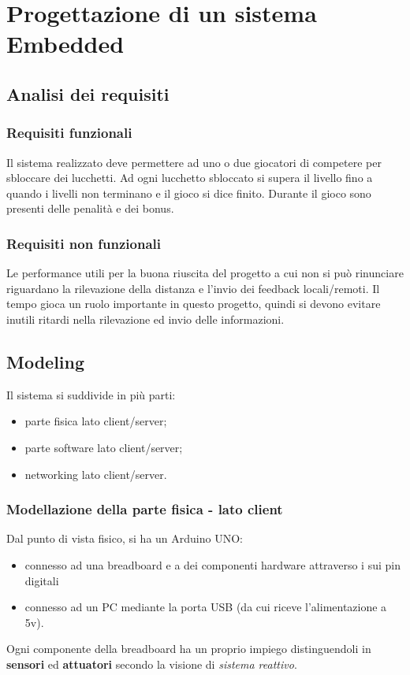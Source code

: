 \chapter{Progettazione di un sistema Embedded}
\section{Analisi dei requisiti}
\subsection{Requisiti funzionali}
Il sistema realizzato deve permettere ad uno o due giocatori di competere per sbloccare dei lucchetti. Ad ogni lucchetto sbloccato si supera il livello fino a quando i livelli non terminano e il gioco si dice finito. Durante il gioco sono presenti delle penalità e dei bonus.

\subsection{Requisiti non funzionali}
Le performance utili per la buona riuscita del progetto a cui non si può rinunciare riguardano la rilevazione della distanza e l'invio dei feedback locali/remoti.
Il tempo gioca un ruolo importante in questo progetto, quindi si devono evitare inutili ritardi nella rilevazione ed invio delle informazioni.

\section{Modeling}
Il sistema si suddivide in più parti:
\begin{itemize}
	\item parte fisica lato client/server;
	\item parte software lato client/server;
	\item networking lato client/server.
\end{itemize}

\subsection{Modellazione della parte fisica - lato client}
Dal punto di vista fisico, si ha un Arduino UNO:
\begin{itemize}
	\item connesso ad una breadboard e a dei componenti hardware attraverso i sui pin digitali
	\item connesso ad un PC mediante la porta USB (da cui riceve l'alimentazione a 5v). 
\end{itemize}
Ogni componente della breadboard ha un proprio impiego distinguendoli in \textbf{sensori} ed \textbf{attuatori} secondo la visione di \textit{sistema reattivo}.

